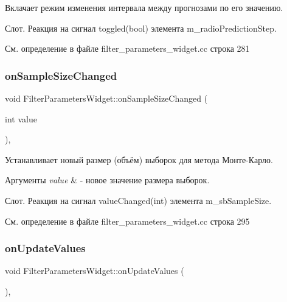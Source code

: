 Вклачает режим изменения интервала между прогнозами по его значению. 

Слот. Реакция на сигнал toggled(bool) элемента m\+\_\+radio\+Prediction\+Step. 

См. определение в файле filter\+\_\+parameters\+\_\+widget.\+cc строка 281

\hypertarget{class_filter_parameters_widget_afc9adb2c97bb297c29a86c2e9ee123b5}{}\label{class_filter_parameters_widget_afc9adb2c97bb297c29a86c2e9ee123b5} 
\subsubsection{\texorpdfstring{on\+Sample\+Size\+Changed}{onSampleSizeChanged}}
{\footnotesize\ttfamily void Filter\+Parameters\+Widget\+::on\+Sample\+Size\+Changed (\begin{DoxyParamCaption}\item[{int}]{value }\end{DoxyParamCaption})\hspace{0.3cm}{\ttfamily [private]}, {\ttfamily [slot]}}



Устанавливает новый размер (объём) выборок для метода Монте-\/Карло. 


\begin{DoxyParams}{Аргументы}
{\em value} & -\/ новое значение размера выборок.\\
\hline
\end{DoxyParams}
Слот. Реакция на сигнал value\+Changed(int) элемента m\+\_\+sb\+Sample\+Size. 

См. определение в файле filter\+\_\+parameters\+\_\+widget.\+cc строка 295

\hypertarget{class_filter_parameters_widget_ad952425cf2dabf76a2f28d19caa2641f}{}\label{class_filter_parameters_widget_ad952425cf2dabf76a2f28d19caa2641f} 
\subsubsection{\texorpdfstring{on\+Update\+Values}{onUpdateValues}}
{\footnotesize\ttfamily void Filter\+Parameters\+Widget\+::on\+Update\+Values (\begin{DoxyParamCaption}{ }\end{DoxyParamCaption})\hspace{0.3cm}{\ttfamily [private]}, {\ttfamily [slot]}}



